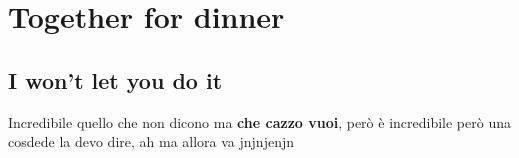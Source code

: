 \chapter{Together for dinner}
\section{I won't let you do it}

Incredibile quello che non dicono ma \textbf{che cazzo vuoi}, però è incredibile 
però una cosdede la devo dire, ah ma allora va
jnjnjenjn